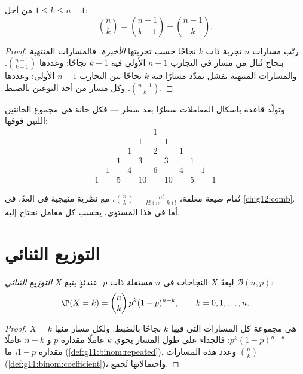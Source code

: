 \begin{proposition}\label{prop:g11:binom:pascal}
من أجل $1 \leq k \leq n - 1$:
\[
\binom{n}{k} = \binom{n-1}{k-1} + \binom{n-1}{k}.
\]
\end{proposition}

\begin{proof}
رتّب مسارات  $n$ تجربة ذات $k$ نجاحًا حسب
تجربتها \emph{الأخيرة}. فالمسارات المنتهية بنجاح تُنال من
مسار في التجارب $n-1$ الأولى فيه $k - 1$ نجاحًا: وعددها
$\binom{n-1}{k-1}$. والمسارات المنتهية بفشل تمدّد مسارًا فيه
$k$ نجاحًا بين التجارب $n-1$ الأولى: وعددها $\binom{n-1}{k}$.
وكل مسار من أحد النوعين بالضبط.
\end{proof}

وتولّد قاعدة باسكال المعاملات سطرًا بعد سطر --- فكل خانة هي
مجموع الخانتين اللتين فوقها:
\[
\begin{array}{ccccccccccc}
&&&&&1&&&&&\\
&&&&1&&1&&&&\\
&&&1&&2&&1&&&\\
&&1&&3&&3&&1&&\\
&1&&4&&6&&4&&1&\\
1&&5&&10&&10&&5&&1
\end{array}
\]

\begin{remark}
تُقام صيغة مغلقة، $\binom nk = \frac{n!}{k!(n-k)!}$، مع
نظرية منهجية في العدّ، في \cref{ch:g12:comb}. أما في
هذا المستوى،  يحسب كل معامل نحتاج إليه.
\end{remark}

\section{التوزيع الثنائي}

\begin{theorem}\label{thm:g11:binom:binomial}
ليعدّ $X$ النجاحات في $n$  مستقلة ذات
 $p$. عندئذٍ يتبع $X$ \emph{التوزيع
الثنائي} $\mathcal B(n, p)$:
\[
\P(X = k) = \binom{n}{k}\, p^k (1-p)^{n-k},
\qquad k = 0, 1, \dots, n .
\]
\end{theorem}

\begin{proof}
 $X = k$ هي مجموعة كل المسارات التي فيها $k$
نجاحًا بالضبط. ولكل مسار منها  $p^k(1-p)^{n-k}$: فالجداء
على طول المسار يحوي $k$ عاملًا مقداره $p$ و $n - k$ عاملًا مقداره $1-p$، 
ما (\cref{def:g11:binom:repeated}). وعدد هذه المسارات $\binom nk$
(\cref{def:g11:binom:coefficient})، واحتمالاتها تُجمع.
\end{proof}

